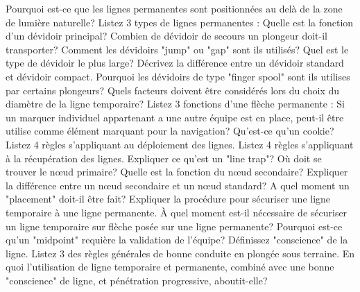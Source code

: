 \documentclass[english,1pt,a4paper]{article}
\begin{document}
	\begin{outline}
		\1 Pourquoi est-ce que les lignes permanentes sont positionnées au delà de la zone de lumière naturelle?	\vspace{2cm}
		\1 Listez 3 types de lignes permanentes :	\vspace{2cm}
		\1 Quelle est la fonction d’un dévidoir principal?	\vspace{2cm}
		\1 Combien de dévidoir de secours un plongeur doit-il transporter?	\vspace{2cm}
		\1 Comment les dévidoirs "jump" ou "gap" sont ils utilisés?	\vspace{2cm}
		\1 Quel est le type de dévidoir le plus large?	\vspace{2cm}
		\1 Décrivez la différence entre un dévidoir standard et dévidoir compact.	\vspace{2cm}
		\1 Pourquoi les dévidoirs de type "finger spool" sont ils utilises par certains plongeurs?	\vspace{2cm}
		\1 Quels facteurs doivent être considérés lors du choix du diamètre de la ligne temporaire?	\vspace{2cm}
		\1 Listez 3 fonctions d’une flèche permanente :	\vspace{2cm}
		\1 Si un marquer individuel appartenant a une autre équipe est en place, peut-il être utilise comme élément marquant pour la navigation?	\vspace{2cm}
		\1 Qu’est-ce qu’un cookie?	\vspace{2cm}
		\1 Listez 4 règles s’appliquant au déploiement des lignes.	\vspace{2cm}
		\1 Listez 4 règles s’appliquant à la récupération des lignes.	\vspace{2cm}
		\1 Expliquer ce qu’est un "line trap"?	\vspace{2cm}
		\1 Où doit se trouver le nœud primaire?	\vspace{2cm}
		\1 Quelle est la fonction du nœud secondaire?	\vspace{2cm}
		\1 Expliquer la différence entre un nœud secondaire et un nœud standard?	\vspace{2cm}
		\1 A quel moment un "placement" doit-il être fait?	\vspace{2cm}
		\1 Expliquer la procédure pour sécuriser une ligne temporaire à une ligne permanente.	\vspace{2cm}
		\1 À quel moment est-il nécessaire de sécuriser un ligne temporaire sur flèche posée sur une ligne permanente?	\vspace{2cm}
		\1 Pourquoi est-ce qu’un "midpoint" requière la validation de l’équipe?	\vspace{2cm}
		\1 Définissez "conscience" de la ligne.	\vspace{2cm}
		\1 Listez 3 des règles générales de bonne conduite en plongée sous terraine.	\vspace{2cm}
		\1 En quoi l’utilisation de ligne temporaire et permanente, combiné avec une bonne "conscience" de ligne, et pénétration progressive, aboutit-elle?	\vspace{2cm}
	\end{outline}
	\pagebreak	
\end{document}
